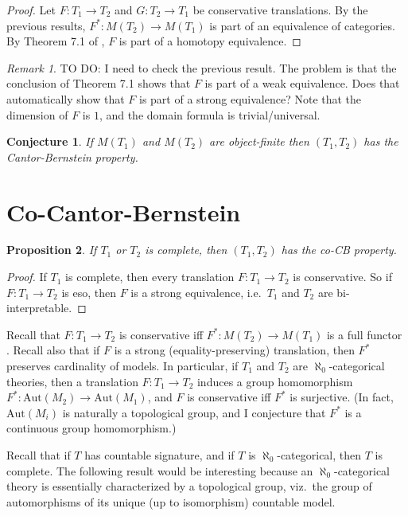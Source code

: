 \documentclass[12pt]{article}
\newtheorem{prop}{Proposition}
\newtheorem{conj}[prop]{Conjecture}
\theoremstyle{definition}
\theoremstyle{remark}
\newtheorem*{note}{Remark}
\newcommand{\3}{\mathcal}
\begin{document}
\begin{proof} Let $F:T_1\to T_2$ and $G:T_2\to T_1$ be conservative
  translations. By the previous results, $F^*:M(T_2)\to M(T_1)$ is
  part of an equivalence of categories. By Theorem 7.1 of
  \citep{summer2020}, $F$ is part of a homotopy
  equivalence.  \end{proof}

\begin{note} TO DO: I need to check the previous result. The problem
  is that the conclusion of Theorem 7.1 shows that $F$ is part of a
  weak equivalence. Does that automatically show that $F$ is part of a
  strong equivalence? Note that the dimension of $F$ is $1$, and the
  domain formula is trivial/universal. \end{note}

\begin{conj} If $M(T_1)$ and $M(T_2)$ are object-finite then
  $(T_1,T_2)$ has the Cantor-Bernstein property.  \end{conj}

\section{Co-Cantor-Bernstein}


\begin{prop} If $T_1$ or $T_2$ is complete, then $(T_1,T_2)$ has the
  co-CB property. \end{prop}

\begin{proof} If $T_1$ is complete, then every translation
  $F:T_1\to T_2$ is conservative. So if $F:T_1\to T_2$ is eso, then
  $F$ is a strong equivalence, i.e.\ $T_1$ and $T_2$ are
  bi-interpretable. \end{proof}

Recall that $F:T_1\to T_2$ is conservative iff $F^*:M(T_2)\to M(T_1)$
is a full functor \citep{barrett2020}. Recall also that if $F$ is a
strong (equality-preserving) translation, then $F^*$ preserves
cardinality of models. In particular, if $T_1$ and $T_2$ are
$\aleph _0$-categorical theories, then a translation $F:T_1\to T_2$
induces a group homomorphism
$F^*:\mathrm{Aut}(M_2)\to \mathrm{Aut}(M_1)$, and $F$ is conservative
iff $F^*$ is surjective. (In fact, $\mathrm{Aut}(M_i)$ is naturally a
topological group, and I conjecture that $F^*$ is a continuous group
homomorphism.)

Recall that if $T$ has countable signature, and if $T$ is
$\aleph _0$-categorical, then $T$ is complete. The following result
would be interesting because an $\aleph _0$-categorical theory is
essentially characterized by a topological group, viz.\ the group of
automorphisms of its unique (up to isomorphism) countable model.
\end{document}
